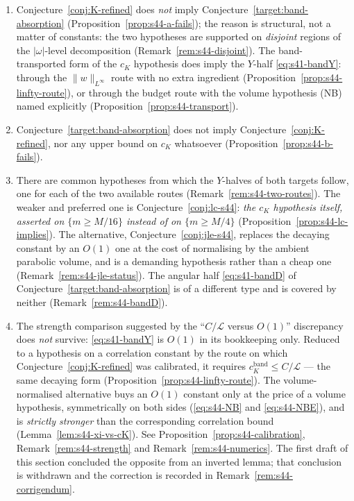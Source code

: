 \documentclass[11pt]{article}
\theoremstyle{definition}
\theoremstyle{remark}
\begin{document}
\begin{enumerate}[label=(\alph*)]
  \item Conjecture~\ref{conj:K-refined} does \emph{not} imply
    Conjecture~\ref{target:band-absorption}
    (Proposition~\ref{prop:s44-a-fails}); the reason is structural, not a
    matter of constants: the two hypotheses are supported on \emph{disjoint}
    regions of the $|\omega|$-level decomposition
    (Remark~\ref{rem:s44-disjoint}). The band-transported form of the $c_K$
    hypothesis does imply the $Y$-half \eqref{eq:s41-bandY}: through the
    $\|w\|_{L^\infty}$ route with no extra ingredient
    (Proposition~\ref{prop:s44-linfty-route}), or through the budget route
    with the volume hypothesis (NB) named explicitly
    (Proposition~\ref{prop:s44-transport}).
  \item Conjecture~\ref{target:band-absorption} does not imply
    Conjecture~\ref{conj:K-refined}, nor any upper bound on $c_K$ whatsoever
    (Proposition~\ref{prop:s44-b-fails}).
  \item There are common hypotheses from which the $Y$-halves of both targets
    follow, one for each of the two available routes
    (Remark~\ref{rem:s44-two-routes}). The weaker and preferred one is
    Conjecture~\ref{conj:lc-s44}: \emph{the $c_K$ hypothesis itself, asserted
    on $\{m\geq M/16\}$ instead of on $\{m\geq M/4\}$}
    (Proposition~\ref{prop:s44-lc-implies}). The alternative,
    Conjecture~\ref{conj:jle-s44}, replaces the decaying constant by an $O(1)$
    one at the cost of normalising by the ambient parabolic volume, and is a
    demanding hypothesis rather than a cheap one
    (Remark~\ref{rem:s44-jle-status}). The angular half \eqref{eq:s41-bandD}
    of Conjecture~\ref{target:band-absorption} is of a different type and is
    covered by neither (Remark~\ref{rem:s44-bandD}).
  \item The strength comparison suggested by the ``$C/\mathcal{L}$ versus
    $O(1)$'' discrepancy does \emph{not} survive: \eqref{eq:s41-bandY} is
    $O(1)$ in its bookkeeping only. Reduced to a hypothesis on a correlation
    constant by the route on which Conjecture~\ref{conj:K-refined} was
    calibrated, it requires $c_K^{\mathrm{band}}\leq C/\mathcal{L}$ --- the
    same decaying form (Proposition~\ref{prop:s44-linfty-route}). The
    volume-normalised alternative buys an $O(1)$ constant only at the price of
    a volume hypothesis, symmetrically on both sides
    (\eqref{eq:s44-NB} and \eqref{eq:s44-NBE}), and is \emph{strictly
    stronger} than the corresponding correlation bound
    (Lemma~\ref{lem:s44-xi-vs-cK}). See
    Proposition~\ref{prop:s44-calibration}, Remark~\ref{rem:s44-strength} and
    Remark~\ref{rem:s44-numerics}. The first draft of this section concluded
    the opposite from an inverted lemma; that conclusion is withdrawn and the
    correction is recorded in Remark~\ref{rem:s44-corrigendum}.
\end{enumerate}
\end{document}
